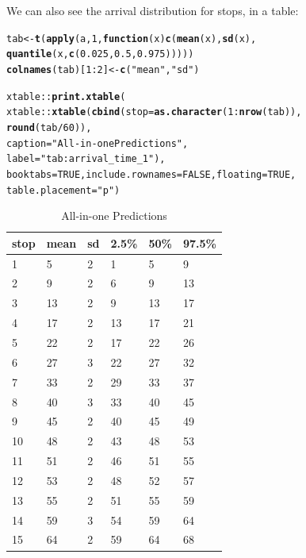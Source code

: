 \documentclass[11pt]{article}\usepackage[]{graphicx}\usepackage[]{color}
\makeatletter
\newcommand{\hlnum}[1]{\textcolor[rgb]{0.686,0.059,0.569}{#1}}%
\newcommand{\hlstr}[1]{\textcolor[rgb]{0.192,0.494,0.8}{#1}}%
\newcommand{\hlopt}[1]{\textcolor[rgb]{0,0,0}{#1}}%
\newcommand{\hlstd}[1]{\textcolor[rgb]{0.345,0.345,0.345}{#1}}%
\newcommand{\hlkwa}[1]{\textcolor[rgb]{0.161,0.373,0.58}{\textbf{#1}}}%
\newcommand{\hlkwb}[1]{\textcolor[rgb]{0.69,0.353,0.396}{#1}}%
\newcommand{\hlkwc}[1]{\textcolor[rgb]{0.333,0.667,0.333}{#1}}%
\newcommand{\hlkwd}[1]{\textcolor[rgb]{0.737,0.353,0.396}{\textbf{#1}}}%
\newenvironment{kframe}{%
 \def\at@end@of@kframe{}%
 \ifinner\ifhmode%
  \def\at@end@of@kframe{\end{minipage}}%
  \begin{minipage}{\columnwidth}%
 \fi\fi%
 \def\FrameCommand##1{\hskip\@totalleftmargin \hskip-\fboxsep
 \colorbox{shadecolor}{##1}\hskip-\fboxsep
     \hskip-\linewidth \hskip-\@totalleftmargin \hskip\columnwidth}%
 \MakeFramed {\advance\hsize-\width
   \@totalleftmargin\z@ \linewidth\hsize
   \@setminipage}}%
 {\par\unskip\endMakeFramed%
 \at@end@of@kframe}
\makeatother
\begin{document}
We can also see the arrival distribution for stops, in a table:
\begin{kframe}
\begin{alltt}
\hlstd{tab} \hlkwb{<-} \hlkwd{t}\hlstd{(}\hlkwd{apply}\hlstd{(a,} \hlnum{1}\hlstd{,} \hlkwa{function}\hlstd{(}\hlkwc{x}\hlstd{)} \hlkwd{c}\hlstd{(}\hlkwd{mean}\hlstd{(x),} \hlkwd{sd}\hlstd{(x),}
                                   \hlkwd{quantile}\hlstd{(x,} \hlkwd{c}\hlstd{(}\hlnum{0.025}\hlstd{,} \hlnum{0.5}\hlstd{,} \hlnum{0.975}\hlstd{)))))}
\hlkwd{colnames}\hlstd{(tab)[}\hlnum{1}\hlopt{:}\hlnum{2}\hlstd{]} \hlkwb{<-} \hlkwd{c}\hlstd{(}\hlstr{"mean"}\hlstd{,} \hlstr{"sd"}\hlstd{)}

\hlstd{xtable}\hlopt{::}\hlkwd{print.xtable}\hlstd{(}
    \hlstd{xtable}\hlopt{::}\hlkwd{xtable}\hlstd{(}\hlkwd{cbind}\hlstd{(}\hlkwc{stop} \hlstd{=} \hlkwd{as.character}\hlstd{(}\hlnum{1}\hlopt{:}\hlkwd{nrow}\hlstd{(tab)),}
                         \hlkwd{round}\hlstd{(tab} \hlopt{/} \hlnum{60}\hlstd{)),}
                   \hlkwc{caption} \hlstd{=} \hlstr{"All-in-one Predictions"}\hlstd{,}
                   \hlkwc{label} \hlstd{=} \hlstr{"tab:arrival_time_1"}\hlstd{),}
    \hlkwc{booktabs} \hlstd{=} \hlnum{TRUE}\hlstd{,} \hlkwc{include.rownames} \hlstd{=} \hlnum{FALSE}\hlstd{,} \hlkwc{floating} \hlstd{=} \hlnum{TRUE}\hlstd{,}
    \hlkwc{table.placement} \hlstd{=} \hlstr{"p"}\hlstd{)}
\end{alltt}
\end{kframe}%
\begin{table}[p]
\centering
\begin{tabular}{llllll}
  \toprule
stop & mean & sd & 2.5\% & 50\% & 97.5\% \\ 
  \midrule
1 & 5 & 2 & 1 & 5 & 9 \\ 
  2 & 9 & 2 & 6 & 9 & 13 \\ 
  3 & 13 & 2 & 9 & 13 & 17 \\ 
  4 & 17 & 2 & 13 & 17 & 21 \\ 
  5 & 22 & 2 & 17 & 22 & 26 \\ 
  6 & 27 & 3 & 22 & 27 & 32 \\ 
  7 & 33 & 2 & 29 & 33 & 37 \\ 
  8 & 40 & 3 & 33 & 40 & 45 \\ 
  9 & 45 & 2 & 40 & 45 & 49 \\ 
  10 & 48 & 2 & 43 & 48 & 53 \\ 
  11 & 51 & 2 & 46 & 51 & 55 \\ 
  12 & 53 & 2 & 48 & 52 & 57 \\ 
  13 & 55 & 2 & 51 & 55 & 59 \\ 
  14 & 59 & 3 & 54 & 59 & 64 \\ 
  15 & 64 & 2 & 59 & 64 & 68 \\ 
   \bottomrule
\end{tabular}
\caption{All-in-one Predictions} 
\label{tab:arrival_time_1}
\end{table}
\end{document}
